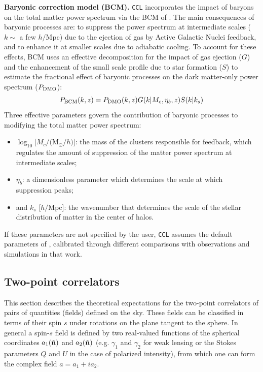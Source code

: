 \documentclass[\docopts]{\docclass}
\newcommand{\nv}{\hat{\bf n}}
\newcommand{\ccl}{{\tt CCL}\xspace}
\begin{document}
 {\bf Baryonic correction model (BCM).} \ccl incorporates the impact of baryons on the total matter power spectrum via the BCM of \citet{Schneider15}. The main consequences of baryonic processes are: to suppress the power spectrum at intermediate scales ($k\sim$ a few $h/$Mpc) due to the ejection of gas by Active Galactic Nuclei feedback, and to enhance it at smaller scales due to adiabatic cooling. To account for these effects, BCM uses an effective decomposition for the impact of gas ejection ($G$) and the enhancement of the small scale profile due to star formation ($S$) to estimate the fractional effect of baryonic processes on the dark matter-only power spectrum ($P_{\rm DMO}$):
\begin{equation}
  P_{\rm BCM}(k,z)=P_{\rm DMO}(k,z) G(k|M_c,\eta_b,z)S(k|k_s)
\end{equation}
Three effective parameters govern the contribution of baryonic processes to modifying the total matter power spectrum:
 \begin{itemize}
   \item $\log_{10} [M_c/($M$_\odot/h)]$: the mass of the clusters responsible for feedback, which regulates the amount of suppression of the matter power spectrum at intermediate scales;
   \item $\eta_b$: a dimensionless parameter which determines the scale at which suppression peaks;
   \item and $k_s$ [$h/$Mpc]: the wavenumber that determines the scale of the stellar distribution of matter in the center of halos.
 \end{itemize}
 If these parameters are not specified by the user, \ccl assumes the default parameters of \citet{Schneider15}, calibrated through different comparisons with observations and simulations in that work.

\subsection{Two-point correlators}

This section describes the theoretical expectations for the two-point correlators of pairs of quantities (fields) defined on the sky. These fields can be classified in terms of their spin $s$ under rotations on the plane tangent to the sphere. In general a spin-$s$ field is defined by two real-valued functions of the spherical coordinates $a_1(\nv)$ and $a_2(\nv)$ (e.g. $\gamma_1$ and $\gamma_2$ for weak lensing or the Stokes parameters $Q$ and $U$ in the case of polarized intensity), from which one can form the complex field $a=a_1+ia_2$.
\end{document}

